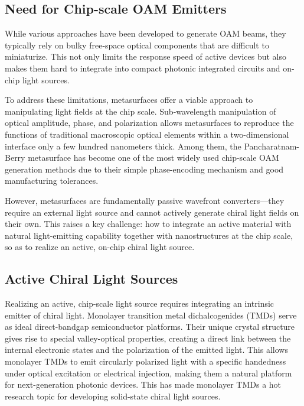 \subsection{Need for Chip-scale OAM Emitters}

While various approaches have been developed to generate OAM beams, they typically rely on bulky free-space optical components that are difficult to miniaturize. This not only limits the response speed of active devices but also makes them hard to integrate into compact photonic integrated circuits and on-chip light sources.

To address these limitations, metasurfaces offer a viable approach to manipulating light fields at the chip scale. Sub-wavelength manipulation of optical amplitude, phase, and polarization allows metasurfaces to  reproduce the functions of traditional macroscopic optical elements within a two-dimensional interface only a few hundred nanometers thick. Among them, the Pancharatnam-Berry metasurface has become one of the most widely used chip-scale OAM generation methods due to their simple phase-encoding mechanism and good manufacturing tolerances.

However, metasurfaces are fundamentally passive wavefront converters—they require an external light source and cannot actively generate chiral light fields on their own. This raises a key challenge: how to integrate an active material with natural light-emitting capability together with nanostructures at the chip scale, so as to realize an active, on-chip chiral light source.

\subsection{Active Chiral Light Sources}

Realizing an active, chip-scale light source requires integrating an intrinsic emitter of chiral light. Monolayer transition metal dichalcogenides (TMDs) serve as ideal direct-bandgap semiconductor platforms. Their unique crystal structure gives rise to special valley-optical properties, creating a direct link between the internal electronic states and the polarization of the emitted light. This allows monolayer TMDs to emit circularly polarized light with a specific handedness under optical excitation or electrical injection, making them a natural platform for next-generation photonic devices. This has made monolayer TMDs a hot research topic for developing solid-state chiral light sources.

